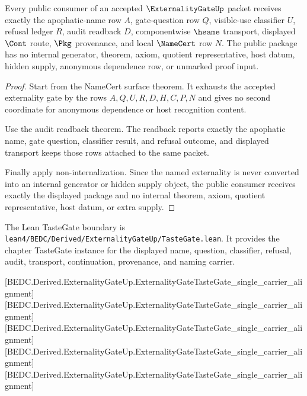 \begin{theorem}
\label{thm:externality-gate-public-consumer-package}
Every public consumer of an accepted $\ExternalityGateUp$ packet receives exactly the apophatic-name row $A$, gate-question row $Q$, visible-use classifier $U$, refusal ledger $R$, audit readback $D$, componentwise $\hsame$ transport, displayed $\Cont$ route, $\Pkg$ provenance, and local $\NameCert$ row $N$. The public package has no internal generator, theorem, axiom, quotient representative, host datum, hidden supply, anonymous dependence row, or unmarked proof input.
\end{theorem}
\begin{proof}
Start from the NameCert surface theorem. It exhausts the accepted externality gate by the rows $A,Q,U,R,D,H,C,P,N$ and gives no second coordinate for anonymous dependence or host recognition content.

Use the audit readback theorem. The readback reports exactly the apophatic name, gate question, classifier result, and refusal outcome, and displayed transport keeps those rows attached to the same packet.

Finally apply non-internalization. Since the named externality is never converted into an internal generator or hidden supply object, the public consumer receives exactly the displayed package and no internal theorem, axiom, quotient representative, host datum, or extra supply.
\end{proof}

The Lean TasteGate boundary is \texttt{lean4/BEDC/Derived/ExternalityGateUp/TasteGate.lean}. It provides the chapter TasteGate instance for the displayed name, question, classifier, refusal, audit, transport, continuation, provenance, and naming carrier.

[BEDC.Derived.ExternalityGateUp.ExternalityGateTasteGate\_single\_carrier\_alignment]
[BEDC.Derived.ExternalityGateUp.ExternalityGateTasteGate\_single\_carrier\_alignment]
[BEDC.Derived.ExternalityGateUp.ExternalityGateTasteGate\_single\_carrier\_alignment]
[BEDC.Derived.ExternalityGateUp.ExternalityGateTasteGate\_single\_carrier\_alignment]
[BEDC.Derived.ExternalityGateUp.ExternalityGateTasteGate\_single\_carrier\_alignment]

